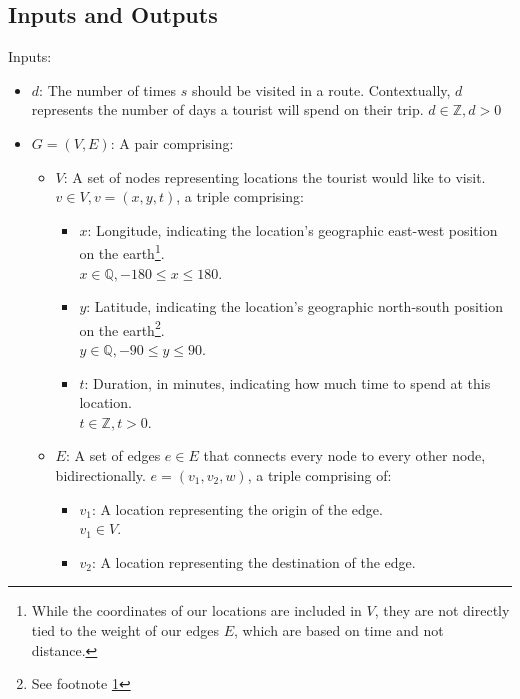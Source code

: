 \subsection{Inputs and Outputs}\label{subsec:inputs-and-outputs}
Inputs:
\begin{itemize}
    \item $d$: The number of times $s$ should be visited in a route.
    Contextually, $d$ represents the number of days a tourist will spend on their trip. $d \in \mathbb{Z}, d > 0$
    \item $G = (V, E)$: A pair comprising:
    \begin{itemize}
        \item[\textbullet] $V$: A set of nodes representing locations the tourist would like to visit.
        $v \in V, v = (x, y, t)$, a triple comprising:
        \begin{itemize}
            \item[\textbullet]$x$: Longitude, indicating the location's geographic east-west position on the
            earth\footnote{\label{latitude-longitude-note}While the coordinates of our locations are
            included in $V$, they are not directly tied to the weight of our edges $E$, which are based on
            time and not distance.}.\\
            $x \in \mathbb{Q}, -180 \leq x \leq 180$.
            \item[\textbullet]$y$: Latitude, indicating the location's geographic north-south position on
            the earth\footnote{See footnote \ref{latitude-longitude-note}}.\\
            $y \in \mathbb{Q}, -90 \leq y \leq 90$.
            \item[\textbullet]$t$: Duration, in minutes, indicating how much time to spend at this location.\\
            $t \in \mathbb{Z}, t > 0$.
        \end{itemize}
        \item[\textbullet] $E$: A set of edges $e \in E$ that connects every node to every other node,
        bidirectionally. $e = (v_1, v_2, w)$, a triple comprising of:
        \begin{itemize}
            \item[\textbullet]$v_1$: A location representing the origin of the edge.\\
            $v_1 \in V$.
            \item[\textbullet]$v_2$: A location representing the destination of the edge.\\

\end{itemize}
\end{itemize}
\end{itemize}
